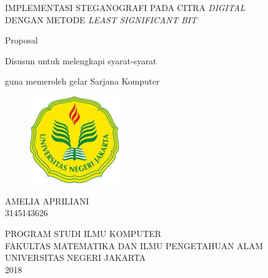 \thispagestyle{empty}
\begin{center}
\large {IMPLEMENTASI STEGANOGRAFI PADA CITRA \emph{DIGITAL} \\ DENGAN METODE \emph{LEAST SIGNIFICANT BIT}}
\end{center}
\bigskip
\vspace{2mm}


\begin{center}
\large{Proposal}

\large{Disusun untuk melengkapi syarat-syarat}

\large{guna memeroleh gelar Sarjana Komputer}

\end{center}


\vspace{5mm}

\begin{figure}[htbp]
\begin{center}
 \includegraphics[width=0.35\textwidth,]{gambar/unj.jpg}
       \end{center}
\end{figure}

\begin{center}
\large{AMELIA APRILIANI}\\
 \large{3145143626}
\end{center}

\vspace{20mm}

\begin{center}
{PROGRAM STUDI ILMU KOMPUTER\\
FAKULTAS MATEMATIKA DAN ILMU PENGETAHUAN ALAM \\
UNIVERSITAS NEGERI JAKARTA \\ 2018}
\end{center}
